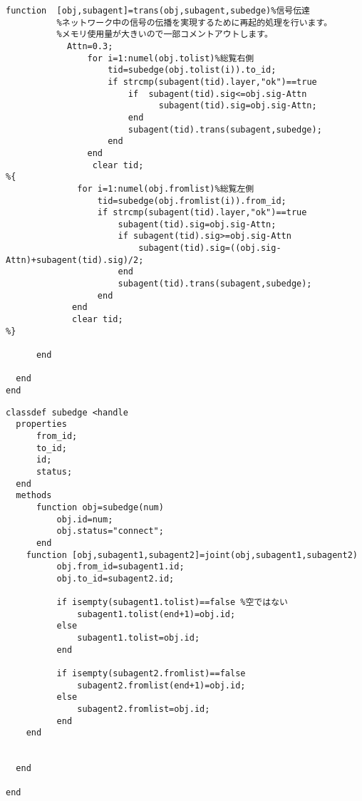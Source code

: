 \begin{lstlisting}[caption=subagent.m]
      function  [obj,subagent]=trans(obj,subagent,subedge)%信号伝達
          %ネットワーク中の信号の伝播を実現するために再起的処理を行います。
          %メモリ使用量が大きいので一部コメントアウトします。
            Attn=0.3;
                for i=1:numel(obj.tolist)%総覧右側
                    tid=subedge(obj.tolist(i)).to_id;
                    if strcmp(subagent(tid).layer,"ok")==true
                        if  subagent(tid).sig<=obj.sig-Attn
                              subagent(tid).sig=obj.sig-Attn;
                        end
                        subagent(tid).trans(subagent,subedge);
                    end
                end
                 clear tid;
%{
              for i=1:numel(obj.fromlist)%総覧左側
                  tid=subedge(obj.fromlist(i)).from_id;
                  if strcmp(subagent(tid).layer,"ok")==true
                      subagent(tid).sig=obj.sig-Attn;
                      if subagent(tid).sig>=obj.sig-Attn
                          subagent(tid).sig=((obj.sig-Attn)+subagent(tid).sig)/2;
                      end
                      subagent(tid).trans(subagent,subedge);
                  end
             end  
             clear tid;
%}

      end

  end
end
\end{lstlisting}
\begin{lstlisting}[caption=subedge.m]
  classdef subedge <handle
  properties
      from_id;
      to_id;
      id;
      status;
  end
  methods
      function obj=subedge(num)
          obj.id=num;
          obj.status="connect";
      end
    function [obj,subagent1,subagent2]=joint(obj,subagent1,subagent2)
          obj.from_id=subagent1.id;
          obj.to_id=subagent2.id;

          if isempty(subagent1.tolist)==false %空ではない
              subagent1.tolist(end+1)=obj.id;
          else
              subagent1.tolist=obj.id;    
          end

          if isempty(subagent2.fromlist)==false
              subagent2.fromlist(end+1)=obj.id;  
          else
              subagent2.fromlist=obj.id;      
          end
    end
      

  end

end
\end{lstlisting}
